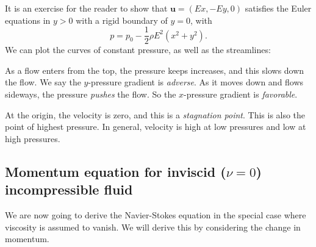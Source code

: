 \documentclass[a4paper]{article}
\begin{document}
\begin{eg}
  It is an exercise for the reader to show that $\mathbf{u} = (Ex, -Ey, 0)$ satisfies the Euler equations in $y > 0$ with a rigid boundary of $y = 0$, with
  \[
    p = p_0 - \frac{1}{2} \rho E^2(x^2 + y^2).
  \]
  We can plot the curves of constant pressure, as well as the streamlines:
  \begin{center}
  \end{center}
  As a flow enters from the top, the pressure keeps increases, and this slows down the flow. We say the $y$-pressure gradient is \emph{adverse}. As it moves down and flows sideways, the pressure \emph{pushes} the flow. So the $x$-pressure gradient is \emph{favorable}.

  At the origin, the velocity is zero, and this is a \emph{stagnation point}. This is also the point of highest pressure. In general, velocity is high at low pressures and low at high pressures.
\end{eg}

\subsection{Momentum equation for inviscid (\texorpdfstring{$\nu = 0$}{nu = 0}) incompressible fluid}
We are now going to derive the Navier-Stokes equation in the special case where viscosity is assumed to vanish. We will derive this by considering the change in momentum.
\end{document}
